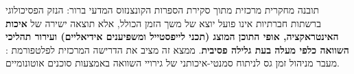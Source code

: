 \begin{insightbox}{תובנה מחקרית מרכזית מתוך סקירת הספרות}
הקונצנזוס המדעי ברור: הנזק הפסיכולוגי ברשתות חברתיות אינו פועל יוצא של משך הזמן הכולל, אלא תוצאה ישירה של \textbf{איכות האינטראקציה, אופי התוכן המוצג (תכני לייפסטייל ומשפיענים אידיאליים) ועירור תהליכי השוואה כלפי מעלה בעת גלילה פסיבית}. ממצא זה מציב את הדרישה המרכזית לפלטפורמת \projectname{}: מעבר מניהול זמן גס לניתוח סמנטי-איכותני של גירויי השוואה באמצעות סוכנים אוטונומיים.
\end{insightbox}

